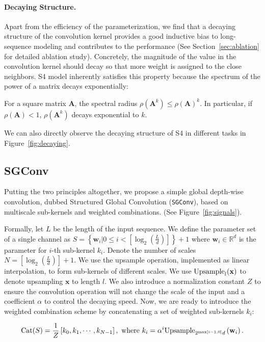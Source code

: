 \paragraph{Decaying Structure.} Apart from the efficiency of the parameterization, we find that a decaying structure of the convolution kernel provides a good inductive bias to long-sequence modeling and contributes to the performance (See Section~\ref{sec:ablation} for detailed ablation study). Concretely, the magnitude of the value in the convolution kernel should decay so that more weight is assigned to the close neighbors. S4 model inherently satisfies this property because the spectrum of the power of a matrix decays exponentially:

\begin{fact}
For a square matrix $\mathbf{A}$, the spectral radius $\rho(\mathbf{A}^k) \le \rho(\mathbf{A})^k$. In particular, if $\rho(\mathbf{A})<1$, $\rho(\mathbf{A}^k)$ decays exponential to $k$. 
\end{fact}

 
We can also directly observe the decaying structure of S4 in different tasks in Figure~\ref{fig:decaying}.
\subsection{SGConv}\label{sec: method} Putting the two principles altogether, we propose a simple global depth-wise convolution, dubbed Structured Global Convolution (\texttt{SGConv}), based on multiscale sub-kernels and weighted combinations. (See Figure~\ref{fig:signals}).

Formally, let $L$ be the length of the input sequence. We define the parameter set of a single channel as $S = \left\{\mathbf{w}_i | 0\le i < \left[\log_2\left(\frac{L}{d}\right)\right]\right\} + 1$ where $\mathbf{w}_i\in\mathbb{R}^d$ is the parameter for $i$-th sub-kernel $k_i$. Denote the number of scales $N = \left[\log_2\left(\frac{L}{d}\right)\right] + 1$. We use the upsample operation, implemented as linear interpolation, to form sub-kernels of different scales. We use $\textnormal{Upsample}_l(\mathbf{x})$ to denote upsampling $\mathbf{x}$ to length $l$. We also introduce a normalization constant $Z$ to ensure the convolution operation will not change the scale of the input and a coefficient $\alpha$ to control the decaying speed. Now, we are ready to introduce the weighted combination scheme by concatenating a set of weighted sub-kernels $k_i$:

\begin{align}\label{eq:concat}
    \textnormal{Cat}(S) = \frac{1}{Z}\left[k_0, k_1, \cdots, k_{N-1}\right], \text{ where }k_i = \alpha^i\textnormal{Upsample}_{2^{\max\left[i-1, 0\right]}d}\left(\mathbf{w}_i\right).
\end{align}

